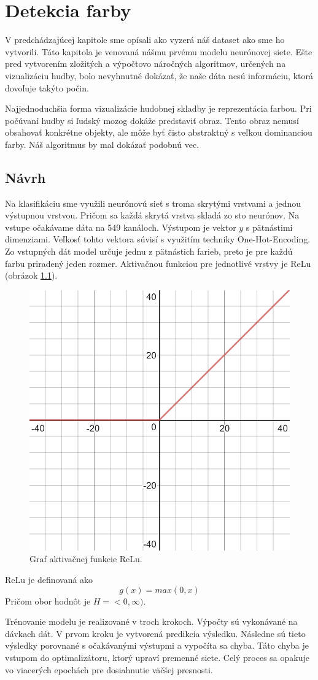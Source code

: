 \chapter{Detekcia farby}

V predchádzajúcej kapitole sme opísali ako vyzerá náš dataset ako sme ho vytvorili.
Táto kapitola je venovaná nášmu prvému modelu neurónovej siete.
Ešte pred vytvorením zložitých a výpočtovo náročných algoritmov, určených na vizualizáciu hudby, bolo nevyhnutné dokázať, že naše dáta nesú informáciu, ktorá dovoľuje takýto počin.

Najjednoduchšia forma vizualizácie hudobnej skladby je reprezentácia farbou.
Pri počúvaní hudby si ľudský mozog dokáže predstaviť obraz.
Tento obraz nemusí obsahovať konkrétne objekty, ale môže byť čisto abstraktný s veľkou dominanciou farby.
Náš algoritmus by mal dokázať podobnú vec.

\section{Návrh}
Na klasifikáciu sme využili neurónovú sieť s troma skrytými vrstvami a jednou výstupnou vrstvou.
Pričom sa každá skrytá vrstva skladá zo sto neurónov.
Na vstupe očakávame dáta na 549 kanáloch.
Výstupom je vektor \(y\) s pätnástimi dimenziami.
Veľkosť tohto vektora súvisí s využitím techniky One-Hot-Encoding.
Zo vstupných dát model určuje jednu z pätnástich farieb, preto je pre každú farbu priradený jeden rozmer.
Aktivačnou funkciou pre jednotlivé vrstvy je ReLu (obrázok \ref{relu}).
\begin{figure}[!ht]
	\centering
	\includegraphics[width=.4\textwidth]{figures/relu}
	\caption{Graf aktivačnej funkcie ReLu.}
	\label{relu}
\end{figure}
ReLu je definovaná ako \[g(x) = max(0, x)\]
Pričom obor hodnôt je \(H = <0, \infty)\).

Trénovanie modelu je realizované v troch krokoch.
Výpočty sú vykonávané na dávkach dát.
V prvom kroku je vytvorená predikcia výsledku.
Následne sú tieto výsledky porovnané s očakávanými výstupmi a vypočíta sa chyba.
Táto chyba je vstupom do optimalizátoru, ktorý upraví premenné siete.
Celý proces sa opakuje vo viacerých epochách pre dosiahnutie väčšej presnosti.

